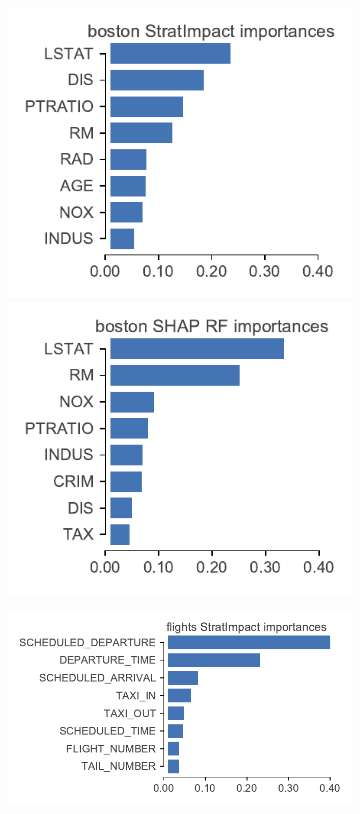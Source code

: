 \documentclass[12pt]{article}
\begin{document}
\begin{figure}[b]
\centering
\begin{subfigure}{1\textwidth}
    \centering
\includegraphics[scale=0.6]{images/boston-features.pdf}
\includegraphics[scale=0.6]{images/boston-features-shap-rf.pdf}
\vspace{-2mm}\vspace{3mm}
\end{subfigure}%
\hfill
\begin{subfigure}{1\textwidth}
    \centering
\includegraphics[scale=0.6]{images/flights-features.pdf}

\end{subfigure}
\end{figure}
\end{document}
